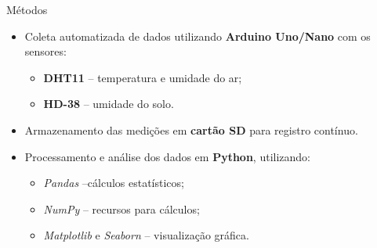 \documentclass{beamer}
\begin{document}

\begin{frame}{Métodos}
\begin{itemize}
    \item Coleta automatizada de dados utilizando \textbf{Arduino Uno/Nano} com os sensores:
    \begin{itemize}
        \item \textbf{DHT11} – temperatura e umidade do ar;
        \item \textbf{HD-38} – umidade do solo.
    \end{itemize}

    \item Armazenamento das medições em \textbf{cartão SD} para registro contínuo.

    \item Processamento e análise dos dados em \textbf{Python}, utilizando:
    \begin{itemize}
        \item \textit{Pandas} –cálculos estatísticos;
        \item \textit{NumPy} – recursos para cálculos;
        \item \textit{Matplotlib} e \textit{Seaborn} – visualização gráfica.
    \end{itemize}
\end{itemize}
\end{frame}
\end{document}
